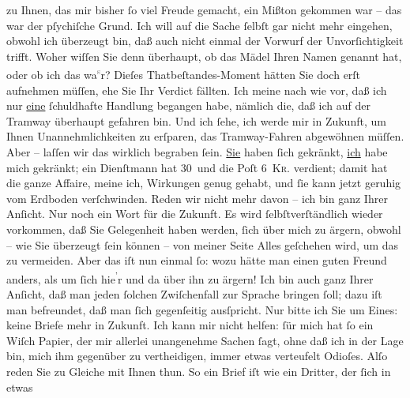 {\begin{ledgroupsized}[t]{13cm}
               zu Ihnen, das mir bisher ſo viel Freude gemacht, ein Mißton gekommen war – das war
               der pſychiſche Grund. Ich will auf die Sache ſelbſt gar nicht mehr eingehen, obwohl
               ich überzeugt bin, daß auch nicht einmal der Vorwurf der Unvorſich{\pb}tigkeit trifft. Woher wiſſen Sie denn überhaupt, ob
               das Mädel Ihren Namen
               genannt hat, oder ob ich das wa\substVorne{}\textsuperscript{\textcolor{gray}{s}}\substDazwischen{}r\substHinten{}? Dieſes Thatbeſtandes-Moment hätten Sie doch erſt aufnehmen müſſen, ehe Sie
               Ihr Verdict fällten. Ich meine nach wie vor, daß ich nur \uline{eine} ſchuldhafte Handlung begangen habe, nämlich die, daß ich auf der
               Tramway überhaupt gefahren bin. Und ich ſehe, ich werde mir in Zukunft, um Ihnen
               Unannehmlichkeiten zu erſparen, das Tramway-Fahren abgewöhnen müſſen.\pend
           \pstart
           Aber – laſſen wir das wirklich begraben ſein. \uline{Sie}
               haben ſich gekränkt, \uline{ich} habe mich gekränkt; ein
               Dienſtmann hat 30 und die Poſt 6 \textsc{Kr.} verdient; damit hat
               die ganze Affaire, meine ich, Wirkungen genug gehabt, und ſie kann jetzt geruhig vom
               Erdboden verſchwinden. Reden wir nicht mehr davon – ich bin ganz Ihrer Anſicht.\pend
           \pstart
           Nur noch ein Wort für die Zukunft. Es wird ſelbſtverſtändlich wieder vorkommen, daß
               Sie Gelegenheit haben werden, ſich über mich zu ärgern, obwohl – wie Sie überzeugt
               ſein können – von meiner Seite Alles geſchehen wird, um das zu {\pb}vermeiden. Aber das iſt nun einmal ſo: wozu hätte
               man einen guten Freund anders, als um ſich hie\substVorne{}\textsuperscript{’}\substDazwischen{}r\substHinten{} und da über ihn zu ärgern! Ich bin auch ganz Ihrer Anſicht, daß man jeden
               ſolchen Zwiſchenfall zur Sprache bringen ſoll; dazu iſt man befreundet, daß man ſich
               gegenſeitig ausſpricht. Nur bitte ich Sie um Eines: keine Briefe mehr in Zukunft. Ich
               kann mir nicht \strikeout{\textcolor{gray}{hef}} helfen: ſür mich hat ſo ein Wiſch Papier, der mir  allerlei unangenehme Sachen ſagt, ohne daß ich in der Lage bin, mich ihm
               gegenüber zu vertheidigen, immer etwas verteufelt Odioſes. Alſo reden Sie zu\strikeout{\textcolor{gray}{r}} Gleiche mit Ihnen thun. So ein Brief iſt wie ein Dritter, der ſich in etwas

\end{ledgroupsized}}
